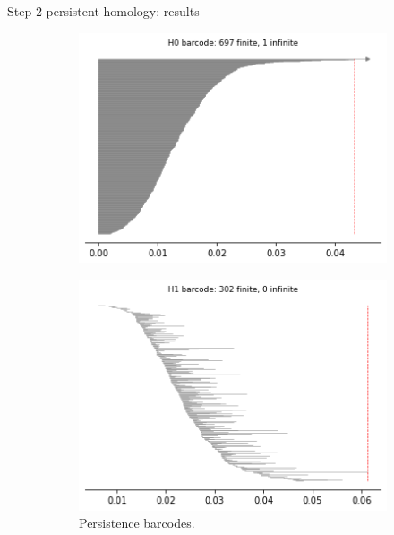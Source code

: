 \documentclass[xcolor={dvipsnames,svgnames}]{beamer}
\begin{document}
\begin{frame}{Step 2 persistent homology: results}
\begin{figure}[H]
\begin{subfigure}[b]{0.25\textwidth}
\end{subfigure}
\begin{subfigure}[b]{0.2\textwidth}
    \includegraphics[width=\textwidth]{figures/X1_H0_barcode.png}
    \caption{}
\end{subfigure}
\begin{subfigure}[b]{0.2\textwidth}
    \includegraphics[width=\textwidth]{figures/X1_H1_barcode.png}
        \caption{Persistence barcodes.}
\end{subfigure}
\begin{subfigure}[b]{0.2\textwidth}

\end{subfigure}
\end{figure}
\end{frame}
\end{document}
